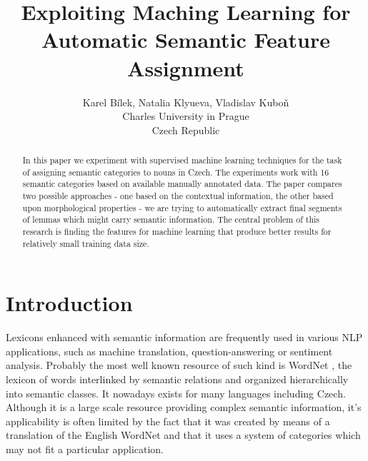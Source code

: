 \documentclass[letterpaper]{article}
\begin{document}
%

\title{Exploiting Maching Learning for Automatic Semantic Feature Assignment}
\author{Karel B\'{i}lek, Natalia Klyueva, Vladislav Kubo\v{n}\\
Charles University in Prague\\
Czech Republic}
\maketitle
\begin{abstract}
In this paper we experiment with supervised machine learning techniques for
the task of assigning semantic categories to nouns in Czech. The experiments work with 16 semantic categories 
based on available manually annotated data. 
The paper compares two possible approaches - one based on the contextual information, 
the other based upon morphological properties  - we are trying to automatically extract final segments 
of lemmas which might carry semantic information. The central problem of this research is finding the features for machine learning 
that produce better results for relatively small training data size. 

\end{abstract}


\section{Introduction}

Lexicons enhanced with semantic information are frequently used 
in various NLP applications, such as machine translation, question-answering
or sentiment analysis. Probably the most well known resource of such kind is 
WordNet \cite{wordnet}, the lexicon of words
interlinked by semantic relations and organized hierarchically into 
semantic classes. It nowadays exists for many languages including Czech. Although it is a large scale resource providing complex semantic information, it's applicability is often limited by the fact that it was created by means of a translation of the English WordNet and that it uses a system of categories which may not fit a particular application.
\end{document}

